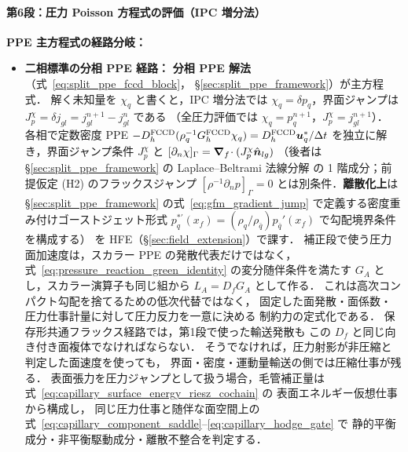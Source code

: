 \paragraph{第6段：圧力 Poisson 方程式の評価（IPC 増分法）}

\noindent\textbf{PPE 主方程式の経路分岐：}
\begin{itemize}[noitemsep,leftmargin=2em]
  \item \textbf{二相標準の分相 PPE 経路：}
        \textbf{分相 PPE 解法}（式~\eqref{eq:split_ppe_fccd_block}，
        §\ref{sec:split_ppe_framework}）が主方程式．
        解く未知量を $\chi_q$ と書くと，IPC 増分法では
        $\chi_q=\delta p_q$，界面ジャンプは
        $J_p^\chi=\delta j_{gl}=j_{gl}^{n+1}-j_{gl}^{n}$ である
        （全圧力評価では $\chi_q=p_q^{n+1}$，$J_p^\chi=j_{gl}^{n+1}$）．
        各相で定数密度 PPE
        $-D_h^{\mathrm{FCCD}}(\rho_q^{-1}G_h^{\mathrm{FCCD}} \chi_q) = D_h^{\mathrm{FCCD}}\bm{u}_q^*/\Delta t$
        を独立に解き，界面ジャンプ条件 $J_p^\chi$ と
        $[\partial_n \chi]_\Gamma=\bm{\nabla}_f\!\cdot(J_p^\chi\hat{\bm n}_{lg})$
        （後者は \S\ref{sec:split_ppe_framework} の Laplace--Beltrami 法線分解
        の 1 階成分；前提仮定 (H2) のフラックスジャンプ $[\rho^{-1}\partial_n p]_\Gamma=0$
        とは別条件．\textbf{離散化上}は \S\ref{sec:split_ppe_framework}
        の式~\eqref{eq:gfm_gradient_jump} で定義する密度重み付けゴーストジェット形式
        $p_q^{*\prime}(x_f)=(\rho_q/\rho_{\bar q})p_{\bar q}'(x_f)$ で勾配境界条件を構成する）
        を HFE（§\ref{sec:field_extension}）で課す．
        補正段で使う圧力面加速度は，スカラー PPE の発散代表だけではなく，
        式~\eqref{eq:pressure_reaction_green_identity} の変分随伴条件を満たす
        $G_A$ とし，スカラー演算子も同じ組から
        $L_A=D_fG_A$ として作る．
        これは高次コンパクト勾配を捨てるための低次代替ではなく，
        固定した面発散・面係数・圧力仕事計量に対して圧力反力を一意に決める
        制約力の定式化である．
        保存形共通フラックス経路では，第1段で使った輸送発散も
        この $D_f$ と同じ向き付き面複体でなければならない．
        そうでなければ，圧力射影が非圧縮と判定した面速度を使っても，
        界面・密度・運動量輸送の側では圧縮仕事が残る．
        表面張力を圧力ジャンプとして扱う場合，毛管補正量は
        式~\eqref{eq:capillary_surface_energy_riesz_cochain} の
        表面エネルギー仮想仕事から構成し，
        同じ圧力仕事と随伴な面空間上の
        式~\eqref{eq:capillary_component_saddle}--\eqref{eq:capillary_hodge_gate} で
        静的平衡成分・非平衡駆動成分・離散不整合を判定する．

\end{itemize}
